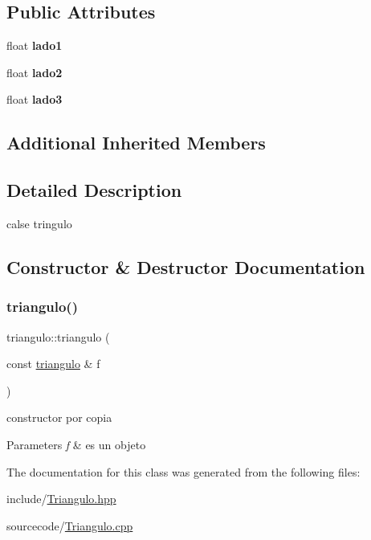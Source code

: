 \subsection*{Public Attributes}
\begin{DoxyCompactItemize}
\item 
\mbox{\label{classtriangulo_a938be48c572df73b6cc2aa18f83b83c4}} 
float {\bfseries lado1}
\item 
\mbox{\label{classtriangulo_ab4441e41406099469c085abb287f9b8c}} 
float {\bfseries lado2}
\item 
\mbox{\label{classtriangulo_aff3acd0f532f7c2e8bac5c2709124433}} 
float {\bfseries lado3}
\end{DoxyCompactItemize}
\subsection*{Additional Inherited Members}


\subsection{Detailed Description}
calse tringulo 

\subsection{Constructor \& Destructor Documentation}
\mbox{\label{classtriangulo_a427e664b4f57a7fbf3b86a7df08c34fe}} 
\subsubsection{\texorpdfstring{triangulo()}{triangulo()}}
{\footnotesize\ttfamily triangulo\+::triangulo (\begin{DoxyParamCaption}\item[{const \hyperlink{classtriangulo}{triangulo} \&}]{f }\end{DoxyParamCaption})}



constructor por copia 


\begin{DoxyParams}{Parameters}
{\em f} & es un objeto \\
\hline
\end{DoxyParams}


The documentation for this class was generated from the following files\+:\begin{DoxyCompactItemize}
\item 
include/\hyperlink{_triangulo_8hpp}{Triangulo.\+hpp}\item 
sourcecode/\hyperlink{_triangulo_8cpp}{Triangulo.\+cpp}\end{DoxyCompactItemize}
